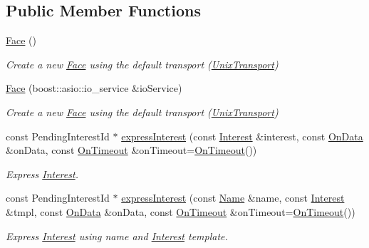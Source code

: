 \subsection*{Public Member Functions}
\begin{DoxyCompactItemize}
\item 
\hyperlink{classndn_1_1Face_a840a295d570861870590aaeebb3c8e2b}{Face} ()
\begin{DoxyCompactList}\small\item\em Create a new \hyperlink{classndn_1_1Face}{Face} using the default transport (\hyperlink{classndn_1_1UnixTransport}{Unix\+Transport}) \end{DoxyCompactList}\item 
\hyperlink{classndn_1_1Face_a55edbdaea6abe5e99ca316b86ff4790c}{Face} (boost\+::asio\+::io\+\_\+service \&io\+Service)
\begin{DoxyCompactList}\small\item\em Create a new \hyperlink{classndn_1_1Face}{Face} using the default transport (\hyperlink{classndn_1_1UnixTransport}{Unix\+Transport}) \end{DoxyCompactList}\item 
const Pending\+Interest\+Id $\ast$ \hyperlink{classndn_1_1Face_aad7474be862c8862d5cdd769b0bfb9bf}{express\+Interest} (const \hyperlink{classndn_1_1Interest}{Interest} \&interest, const \hyperlink{namespacendn_a3594ce6ee9b530d1fd0eb0d59d3587da}{On\+Data} \&on\+Data, const \hyperlink{namespacendn_aa4752a1808de5e7246dd6b1151e4e87f}{On\+Timeout} \&on\+Timeout=\hyperlink{namespacendn_aa4752a1808de5e7246dd6b1151e4e87f}{On\+Timeout}())
\begin{DoxyCompactList}\small\item\em Express \hyperlink{classndn_1_1Interest}{Interest}. \end{DoxyCompactList}\item 
const Pending\+Interest\+Id $\ast$ \hyperlink{classndn_1_1Face_a57ef94e7b1cf5309a1bd602e3dfb88a7}{express\+Interest} (const \hyperlink{classndn_1_1Name}{Name} \&name, const \hyperlink{classndn_1_1Interest}{Interest} \&tmpl, const \hyperlink{namespacendn_a3594ce6ee9b530d1fd0eb0d59d3587da}{On\+Data} \&on\+Data, const \hyperlink{namespacendn_aa4752a1808de5e7246dd6b1151e4e87f}{On\+Timeout} \&on\+Timeout=\hyperlink{namespacendn_aa4752a1808de5e7246dd6b1151e4e87f}{On\+Timeout}())
\begin{DoxyCompactList}\small\item\em Express \hyperlink{classndn_1_1Interest}{Interest} using name and \hyperlink{classndn_1_1Interest}{Interest} template. \end{DoxyCompactList}\item 

\end{DoxyCompactItemize}
